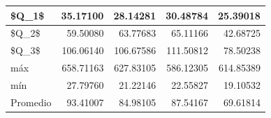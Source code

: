 \begin{table}

\centering
\begin{tabular}[t]{l|r|r|r|r}
\hline
\$Q\_1\$ & 35.17100 & 28.14281 & 30.48784 & 25.39018\\
\hline
\$Q\_2\$ & 59.50080 & 63.77683 & 65.11166 & 42.68725\\
\hline
\$Q\_3\$ & 106.06140 & 106.67586 & 111.50812 & 78.50238\\
\hline
máx & 658.71163 & 627.83105 & 586.12305 & 614.85389\\
\hline
mín & 27.79760 & 21.22146 & 22.55827 & 19.10532\\
\hline
Promedio & 93.41007 & 84.98105 & 87.54167 & 69.61814\\
\hline
\end{tabular}
\centering
\begin{tabular}[t]{}
\hline

\hline
\end{tabular}
\end{table}
